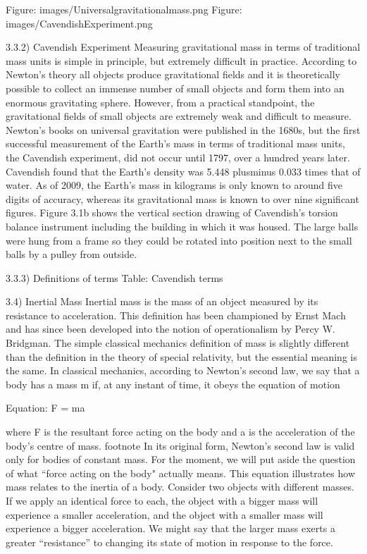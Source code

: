 \documentclass{book}
\begin{document}
    Figure: images/Universalgravitationalmass.png
    Figure: images/CavendishExperiment.png

    3.3.2) Cavendish Experiment
    Measuring gravitational mass in terms of traditional mass units is simple in principle, but extremely difficult in practice. According to Newton's theory all objects produce gravitational fields and it is theoretically possible to collect an immense number of small objects and form them into an enormous gravitating sphere. However, from a practical standpoint, the gravitational fields of small objects are extremely weak and difficult to measure. Newton's books on universal gravitation were published in the 1680s, but the first successful measurement of the Earth's mass in terms of traditional mass units, the Cavendish experiment, did not occur until 1797, over a hundred years later. Cavendish found that the Earth's density was 5.448 plusminus 0.033 times that of water. As of 2009, the Earth's mass in kilograms is only known to around five digits of accuracy, whereas its gravitational mass is known to over nine significant figures.  Figure 3.1b shows the vertical section drawing of Cavendish's torsion balance instrument including the building in which it was housed. The large balls were hung from a frame so they could be rotated into position next to the small balls by a pulley from outside.
    
    3.3.3) Definitions of terms
    Table: Cavendish terms
    
    3.4) Inertial Mass
    Inertial mass is the mass of an object measured by its resistance to acceleration. This definition has been championed by Ernst Mach and has since been developed into the notion of operationalism by Percy W. Bridgman. The simple classical mechanics definition of mass is slightly different than the definition in the theory of special relativity, but the essential meaning is the same. In classical mechanics, according to Newton's second law, we say that a body has a mass m if, at any instant of time, it obeys the equation of motion
    
    Equation: F = ma
    
    where F is the resultant force acting on the body and a is the acceleration of the body's centre of mass. footnote{ In its original form, Newton's second law is valid only for bodies of constant mass.} For the moment, we will put aside the question of what ``force acting on the body" actually means. This equation illustrates how mass relates to the inertia of a body. Consider two objects with different masses. If we apply an identical force to each, the object with a bigger mass will experience a smaller acceleration, and the object with a smaller mass will experience a bigger acceleration. We might say that the larger mass exerts a greater ``resistance'' to changing its state of motion in response to the force.
    
\end{document}
